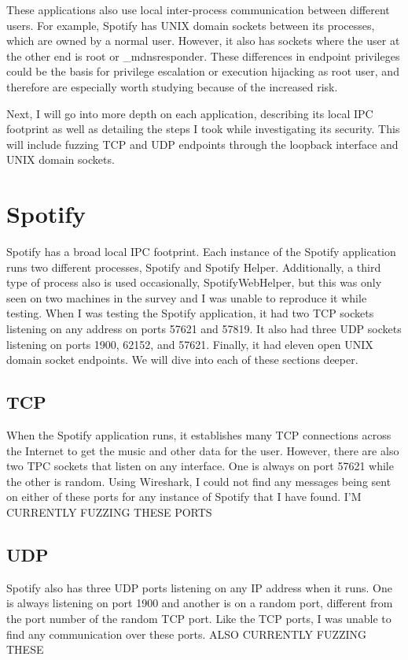 These applications also use local inter-process communication between different users.  For example, Spotify has UNIX domain sockets between its processes, which are owned by a normal user.  However, it also has sockets where the user at the other end is root or \_mdnsresponder.  These differences in endpoint privileges could be the basis for privilege escalation or execution hijacking as root user, and therefore are especially worth studying because of the increased risk.

Next, I will go into more depth on each application, describing its local IPC footprint as well as detailing the steps I took while investigating its security.  This will include fuzzing TCP and UDP endpoints through the loopback interface and UNIX domain sockets.

\section{Spotify}
\label{sec:spotify}
Spotify has a broad local IPC footprint.  Each instance of the Spotify application runs two different processes, Spotify and Spotify Helper.  Additionally, a third type of process also is used occasionally, SpotifyWebHelper, but this was only seen on two machines in the survey and I was unable to reproduce it while testing.  When I was testing the Spotify application, it had two TCP sockets listening on any address on ports 57621 and 57819.  It also had three UDP sockets listening on ports 1900, 62152, and 57621.  Finally, it had eleven open UNIX domain socket endpoints.  We will dive into each of these sections deeper.

\subsection{TCP}
\label{sec:spotifyTcp}
When the Spotify application runs, it establishes many TCP connections across the Internet to get the music and other data for the user.  However, there are also two TPC sockets that listen on any interface.  One is always on port 57621 while the other is random.  Using Wireshark, I could not find any messages being sent on either of these ports for any instance of Spotify that I have found.
I'M CURRENTLY FUZZING THESE PORTS

\subsection{UDP}
\label{sec:spotifyUdp}
Spotify also has three UDP ports listening on any IP address when it runs.  One is always listening on port 1900 and another is on a random port, different from the port number of the random TCP port.  Like the TCP ports, I was unable to find any communication over these ports.
ALSO CURRENTLY FUZZING THESE

